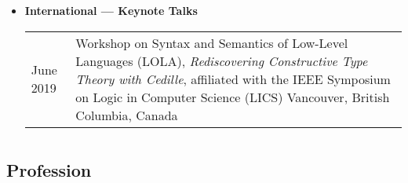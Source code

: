 \documentclass[10pt]{article}
\begin{document}
\begin{itemize}

\item[] \textbf{International --- Keynote Talks}
\\[1.3ex]
\begin{tabular}{l@{\quad\ }p{34em}} 
 June 2019 
 & Workshop on Syntax and Semantics of Low-Level Languages (LOLA),
   \emph{Rediscovering Constructive Type Theory with Cedille},
   affiliated with the IEEE Symposium on Logic in Computer Science (LICS)
   Vancouver, British Columbia, Canada
   \smallskip 
\end{tabular}

\end{itemize}

\section*{\service}

\subsection*{Profession}

\end{document}
